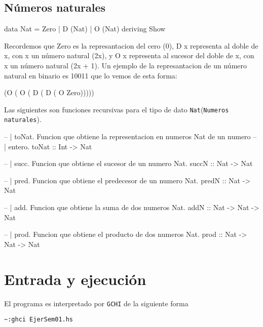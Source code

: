 \documentclass[spanish,12pt,letterpaper]{article}
\begin{document}
\subsection{Números naturales}

\begin{code}
  data Nat = Zero | D (Nat) | O (Nat) deriving Show
\end{code}

Recordemos que Zero es la represantacion del cero (0), D x representa al doble
de x, con x un número natural (2x), y O x representa al sucesor del doble de x,
con x un número natural (2x + 1). Un ejemplo de la represantacion de un número
natural en binario es 10011 que lo vemos de esta forma:

\begin{code}
  (O ( O ( D ( D ( O Zero)))))
\end{code}

Las siguientes son funciones recursivas para el tipo de dato \texttt{Nat}(\texttt{Numeros naturales}).

\begin{code}
  -- | toNat. Funcion que obtiene la representacion en numeros Nat de un numero
  -- | entero.
  toNat :: Int -> Nat

  -- | succ. Funcion que obtiene el sucesor de un numero Nat.
  succN :: Nat -> Nat

  -- | pred. Funcion que obtiene el predecesor de un numero Nat.
  predN :: Nat -> Nat

  -- | add. Funcion que obtiene la suma de dos numeros Nat.
  addN :: Nat -> Nat -> Nat

  -- | prod. Funcion que obtiene el producto de dos numeros Nat.
  prod :: Nat -> Nat -> Nat

\end{code}

\section{Entrada y ejecución}

El programa es interpretado por \texttt{GCHI} de la siguiente forma
\begin{lstlisting}[]
  ~:ghci EjerSem01.hs
\end{lstlisting}
\end{document}
